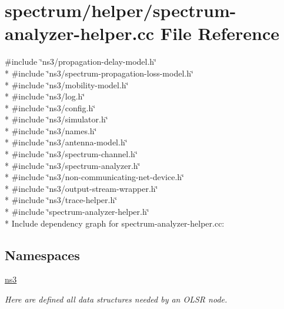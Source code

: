 \hypertarget{spectrum-analyzer-helper_8cc}{}\section{spectrum/helper/spectrum-\/analyzer-\/helper.cc File Reference}
\label{spectrum-analyzer-helper_8cc}
{\ttfamily \#include \char`\"{}ns3/propagation-\/delay-\/model.\+h\char`\"{}}\\*
{\ttfamily \#include \char`\"{}ns3/spectrum-\/propagation-\/loss-\/model.\+h\char`\"{}}\\*
{\ttfamily \#include \char`\"{}ns3/mobility-\/model.\+h\char`\"{}}\\*
{\ttfamily \#include \char`\"{}ns3/log.\+h\char`\"{}}\\*
{\ttfamily \#include \char`\"{}ns3/config.\+h\char`\"{}}\\*
{\ttfamily \#include \char`\"{}ns3/simulator.\+h\char`\"{}}\\*
{\ttfamily \#include \char`\"{}ns3/names.\+h\char`\"{}}\\*
{\ttfamily \#include \char`\"{}ns3/antenna-\/model.\+h\char`\"{}}\\*
{\ttfamily \#include \char`\"{}ns3/spectrum-\/channel.\+h\char`\"{}}\\*
{\ttfamily \#include \char`\"{}ns3/spectrum-\/analyzer.\+h\char`\"{}}\\*
{\ttfamily \#include \char`\"{}ns3/non-\/communicating-\/net-\/device.\+h\char`\"{}}\\*
{\ttfamily \#include \char`\"{}ns3/output-\/stream-\/wrapper.\+h\char`\"{}}\\*
{\ttfamily \#include \char`\"{}ns3/trace-\/helper.\+h\char`\"{}}\\*
{\ttfamily \#include \char`\"{}spectrum-\/analyzer-\/helper.\+h\char`\"{}}\\*
Include dependency graph for spectrum-\/analyzer-\/helper.cc\+:
\subsection*{Namespaces}
\begin{DoxyCompactItemize}
\item 
 \hyperlink{namespacens3}{ns3}
\begin{DoxyCompactList}\small\item\em Here are defined all data structures needed by an O\+L\+SR node. \end{DoxyCompactList}\end{DoxyCompactItemize}
